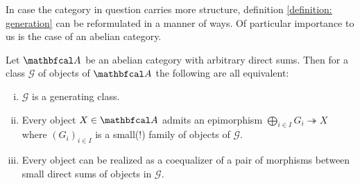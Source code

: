 In case the category in question carries more structure, definition \ref{definition: generation} can be reformulated in a manner of ways. Of particular importance to us is the case of an abelian category.
\begin{lemma}
	\label{lemma: generating classes in abelian categories}
	
	Let $\category A$ be an abelian category with arbitrary direct sums. Then for a class $\mathcal G$ of objects of $\category A$ the following are all equivalent:
	\begin{enumerate}[(i)]
		\item
		\label{generating sets in abelian categories: i}
		$\mathcal G$ is a generating class.
		
		\item
		\label{generating sets in abelian categories: epi}
		Every object $X\in\category A$ admits an epimorphism $\bigoplus_{i\in I} G_i \twoheadrightarrow X$ where $(G_i)_{i\in I}$ is a small(!) family of objects of $\mathcal G$.
		
		\item
		\label{generating sets in abelian categories: presentable}
		Every object can be realized as a coequalizer of a pair of morphisms between small direct sums of objects in $\mathcal G$.
	\end{enumerate}
\end{lemma}
